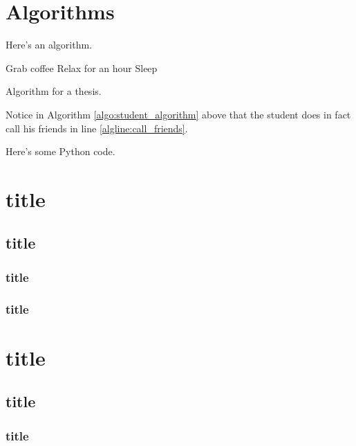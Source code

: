 \section{Algorithms}

Here's an algorithm.

\begin{algorithm}
	\label{algo:student_algorithm}

	\BlankLine
	
	Grab coffee\;
	Relax for an hour\;
	\BlankLine
	Sleep\;
	\caption{Algorithm for a thesis.}
\end{algorithm}

Notice in Algorithm \ref{algo:student_algorithm} above that the student does in fact call his friends in line \ref{algline:call_friends}.

Here's some Python code.




\section{title}
\blindtext

\subsection{title}
\blindtext

\subsubsection{title}
\blindtext

\subsubsection{title}
\blindtext

\section{title}
\blindtext
\subsection{title}
\blindtext

\subsubsection{title}
\blindtext
